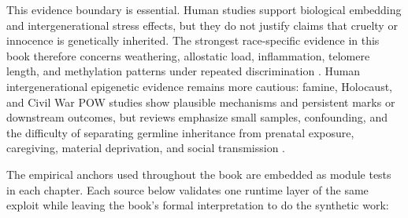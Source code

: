 This evidence boundary is essential. Human studies support biological embedding
and intergenerational stress effects, but they do not justify claims that cruelty
or innocence is genetically inherited. The strongest race-specific evidence in
this book therefore concerns weathering, allostatic load, inflammation, telomere
length, and methylation patterns under repeated discrimination
\cite{geronimus_weathering_2006,duru_allostatic_mortality_2012,ruiz_narvaez_racism_methylation_2024,spears_lifespan_stress_inflammation_2026}.
Human intergenerational epigenetic evidence remains more cautious: famine,
Holocaust, and Civil War POW studies show plausible mechanisms and persistent
marks or downstream outcomes, but reviews emphasize small samples, confounding,
and the difficulty of separating germline inheritance from prenatal exposure,
caregiving, material deprivation, and social transmission
\cite{heijmans_dutch_famine_methylation_2008,yehuda_holocaust_fkbp5_2016,costa_paternal_trauma_pow_2018,zhou_ryan_biological_embedding_2023}.

The empirical anchors used throughout the book are embedded as module tests in each chapter. Each source below validates one runtime layer of the same exploit while leaving the book's formal interpretation to do the synthetic work:


